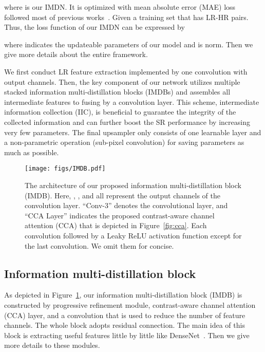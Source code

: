 \documentclass[sigconf]{acmart}
\begin{document}
where  is our IMDN. It is optimized with mean absolute error (MAE) loss followed most of previous works~\cite{EDSR,IDN,RDN,RCAN,CARN}. Given a training set  that has  LR-HR pairs. Thus, the loss function of our IMDN can be expressed by

where  indicates the updateable parameters of our model and  is  norm. Then we give more details about the entire framework.

We first conduct LR feature extraction implemented by one  convolution with  output channels. Then, the key component of our network utilizes multiple stacked information multi-distillation blocks (IMDBs) and assembles all intermediate features to fusing by a  convolution layer. This scheme,  intermediate information collection (IIC), is beneficial to guarantee the integrity of the collected information and can further boost the SR performance by increasing very few parameters. The final upsampler only consists of one learnable layer and a non-parametric operation (sub-pixel convolution) for saving parameters as much as possible.


\begin{figure}[htpb]
	\centering
	\texttt{[image: figs/IMDB.pdf]}
	\vspace{-3mm}
	\caption{The architecture of our proposed information multi-distillation block (IMDB). Here, , , and  all represent the output channels of the convolution layer. ``Conv-3'' denotes the  convolutional layer, and ``CCA Layer'' indicates the proposed contrast-aware channel attention (CCA) that is depicted in Figure~\ref{fig:cca}. Each convolution followed by a Leaky ReLU activation function except for the last  convolution. We omit them for concise.}
	\label{fig:IMDB}
\end{figure}

\subsection{Information multi-distillation block}
As depicted in Figure~\ref{fig:IMDB}, our information multi-distillation block (IMDB) is constructed by progressive refinement module, contrast-aware channel attention (CCA) layer, and a  convolution that is used to reduce the number of feature channels. The whole block adopts residual connection. The main idea of this block is extracting useful features little by little like DenseNet~\cite{DenseNet}. Then we give more details to these modules.
\end{document}

